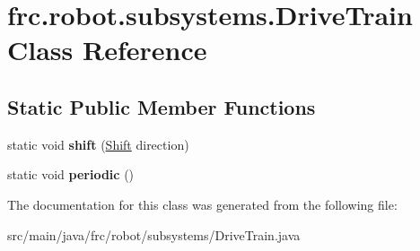 \hypertarget{classfrc_1_1robot_1_1subsystems_1_1_drive_train}{}\section{frc.\+robot.\+subsystems.\+Drive\+Train Class Reference}
\label{classfrc_1_1robot_1_1subsystems_1_1_drive_train}
\subsection*{Static Public Member Functions}
\begin{DoxyCompactItemize}
\item 
\mbox{\label{classfrc_1_1robot_1_1subsystems_1_1_drive_train_a3288b5af8182d08f76290b257041538c}} 
static void {\bfseries shift} (\hyperlink{enumfrc_1_1robot_1_1_enums_1_1_shift}{Shift} direction)
\item 
\mbox{\label{classfrc_1_1robot_1_1subsystems_1_1_drive_train_a883baac3715e22887c0ec5ce825fbfab}} 
static void {\bfseries periodic} ()
\end{DoxyCompactItemize}


The documentation for this class was generated from the following file\+:\begin{DoxyCompactItemize}
\item 
src/main/java/frc/robot/subsystems/Drive\+Train.\+java\end{DoxyCompactItemize}
